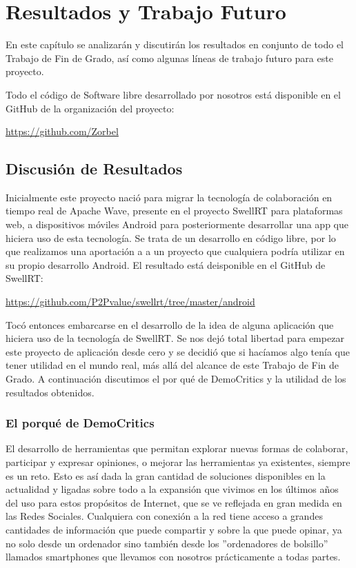 \newpage
\thispagestyle{sectioned}
\chapter{Resultados y Trabajo Futuro}

En este capítulo se analizarán y discutirán los resultados en conjunto de todo el Trabajo de Fin de Grado, así como algunas líneas de trabajo futuro para este proyecto.

Todo el código de Software libre desarrollado por nosotros está disponible en el GitHub de la organización del proyecto:

\url{https://github.com/Zorbel}

\section{Discusión de Resultados}

Inicialmente este proyecto nació para migrar la tecnología de colaboración en tiempo real de Apache Wave, presente en el proyecto SwellRT para plataformas web, a dispositivos móviles Android para posteriormente desarrollar una app que hiciera uso de esta tecnología. Se trata de un desarrollo en código libre, por lo que realizamos una aportación a a un proyecto que cualquiera podría utilizar en su propio desarrollo Android. El resultado está deisponible en el GitHub de SwellRT:

\url{https://github.com/P2Pvalue/swellrt/tree/master/android}

Tocó entonces embarcarse en el desarrollo de la idea de alguna aplicación que hiciera uso de la tecnología de SwellRT. Se nos dejó total libertad para empezar este proyecto de aplicación desde cero y se decidió que si hacíamos algo tenía que tener utilidad en el mundo real, más allá del alcance de este Trabajo de Fin de Grado. A continuación discutimos el por qué de DemoCritics y la utilidad de los resultados obtenidos. 

\subsection{El porqué de DemoCritics}

El desarrollo de herramientas que permitan explorar nuevas formas de colaborar, participar y expresar opiniones, o mejorar las herramientas ya existentes, siempre es un reto. Esto es así dada la gran cantidad de soluciones disponibles en la actualidad y ligadas sobre todo a la expansión que vivimos en los últimos años del uso para estos propósitos de Internet, que se ve reflejada en gran medida en las Redes Sociales. Cualquiera con conexión a la red tiene acceso a grandes cantidades de información que puede compartir y sobre la que puede opinar, ya no solo desde un ordenador sino también desde los ''ordenadores de bolsillo'' llamados smartphones que llevamos con nosotros prácticamente a todas partes.

